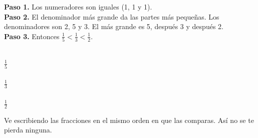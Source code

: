 \begin{wbexample}
\textbf{Paso 1.} Los numeradores son iguales (1, 1 y 1).\\[1mm]
\textbf{Paso 2.} El denominador más grande da las partes más pequeñas. Los denominadores son 2, 5 y 3. El más grande es 5, después 3 y después 2.\\[1mm]
\textbf{Paso 3.} Entonces $\frac{1}{5} < \frac{1}{3} < \frac{1}{2}$.

\begin{center}
\\[1mm]
$\frac{1}{5}$\\[3mm]
\\[1mm]
$\frac{1}{3}$\\[3mm]
\\[1mm]
$\frac{1}{2}$
\end{center}
\end{wbexample}

\begin{wbtip}
Ve escribiendo las fracciones en el mismo orden en que las comparas. Así no se te pierda ninguna.
\end{wbtip}

